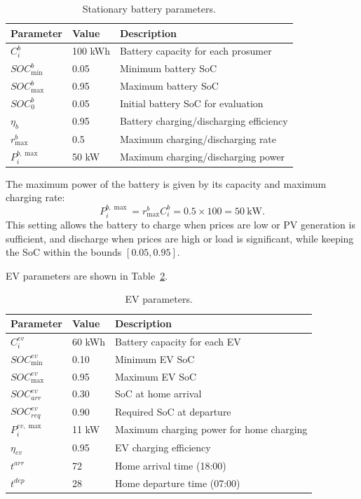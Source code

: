 \begin{table}[htpb]
  \centering
  \caption{Stationary battery parameters.}\label{tab:battery-params}
  \begin{tabular}{lll}
    \toprule
    Parameter & Value & Description \\
    \midrule
    \(C^b_i\) & 100 kWh & Battery capacity for each prosumer \\
    \(SOC^b_{\min}\) & 0.05 & Minimum battery SoC \\
    \(SOC^b_{\max}\) & 0.95 & Maximum battery SoC \\
    \(SOC^b_{0}\) & 0.05 & Initial battery SoC for evaluation \\
    \(\eta_b\) & 0.95 & Battery charging/discharging efficiency \\
    \(r^b_{\max}\) & 0.5 & Maximum charging/discharging rate \\
    \(P^{b,\max}_i\) & 50 kW & Maximum charging/discharging power \\
    \bottomrule
  \end{tabular}
\end{table}

The maximum power of the battery is given by its capacity and maximum charging rate:
\[
  P^{b,\max}_i=r^b_{\max}C^b_i=0.5\times 100=50\ \mathrm{kW}.
\]
This setting allows the battery to charge when prices are low or PV generation is sufficient, and discharge when prices are high or load is significant, while keeping the SoC within the bounds \([0.05,0.95]\).

EV parameters are shown in Table~\ref{tab:ev-params}.

\begin{table}[htpb]
  \centering
  \caption{EV parameters.}\label{tab:ev-params}
  \begin{tabular}{lll}
    \toprule
    Parameter & Value & Description \\
    \midrule
    \(C^{ev}_i\) & 60 kWh & Battery capacity for each EV \\
    \(SOC^{ev}_{\min}\) & 0.10 & Minimum EV SoC \\
    \(SOC^{ev}_{\max}\) & 0.95 & Maximum EV SoC \\
    \(SOC^{ev}_{arr}\) & 0.30 & SoC at home arrival \\
    \(SOC^{ev}_{req}\) & 0.90 & Required SoC at departure \\
    \(P^{ev,\max}_i\) & 11 kW & Maximum charging power for home charging \\
    \(\eta_{ev}\) & 0.95 & EV charging efficiency \\
    \(t^{arr}\) & 72 & Home arrival time (18:00) \\
    \(t^{dep}\) & 28 & Home departure time (07:00) \\
    \bottomrule
  \end{tabular}
\end{table}

